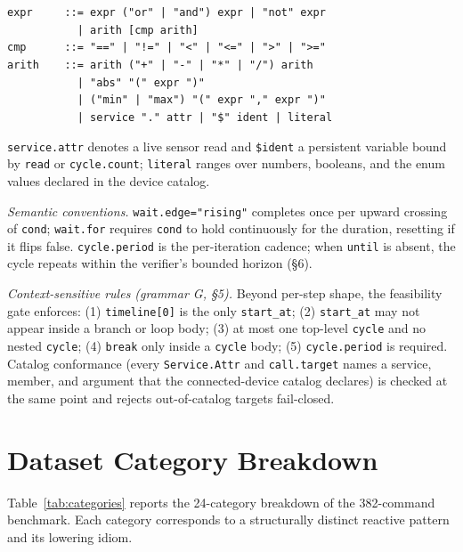 \documentclass[sigconf,nonacm,anonymous,review]{acmart}
\begin{document}
{\begin{flushleft}
\texttt{expr \ \ \ \ ::= expr ("or" | "and") expr | "not" expr}\\
\texttt{\ \ \ \ \ \ \ \ \ \ \ | arith [cmp arith]}\\
\texttt{cmp \ \ \ \ \ ::= "==" | "!=" | "<" | "<=" | ">" | ">="}\\
\texttt{arith \ \ \ ::= arith ("+" | "-" | "*" | "/") arith}\\
\texttt{\ \ \ \ \ \ \ \ \ \ \ | "abs" "(" expr ")"}\\
\texttt{\ \ \ \ \ \ \ \ \ \ \ | ("min" | "max") "(" expr "," expr ")"}\\
\texttt{\ \ \ \ \ \ \ \ \ \ \ | service "." attr | "\$" ident | literal}
\end{flushleft}
}

\noindent\texttt{service.attr} denotes a live sensor read and \texttt{\$}\texttt{ident} a persistent variable bound by \texttt{read} or \texttt{cycle.count}; \texttt{literal} ranges over numbers, booleans, and the enum values declared in the device catalog.

\noindent\emph{Semantic conventions.} \texttt{wait.edge="rising"} completes once per upward crossing of \texttt{cond}; \texttt{wait.for} requires \texttt{cond} to hold continuously for the duration, resetting if it flips false. \texttt{cycle.period} is the per-iteration cadence; when \texttt{until} is absent, the cycle repeats within the verifier's bounded horizon (\S6).

\noindent\emph{Context-sensitive rules (grammar G, \S5).} Beyond per-step shape, the feasibility gate enforces: (1) \texttt{timeline[0]} is the only \texttt{start\_at}; (2) \texttt{start\_at} may not appear inside a branch or loop body; (3) at most one top-level \texttt{cycle} and no nested \texttt{cycle}; (4) \texttt{break} only inside a \texttt{cycle} body; (5) \texttt{cycle.period} is required. Catalog conformance (every \texttt{Service.Attr} and \texttt{call.target} names a service, member, and argument that the connected-device catalog declares) is checked at the same point and rejects out-of-catalog targets fail-closed.

\section{Dataset Category Breakdown}
\label{app:categories}

Table~\ref{tab:categories} reports the 24-category breakdown of the 382-command benchmark. Each category corresponds to a structurally distinct reactive pattern and its lowering idiom.
\end{document}
